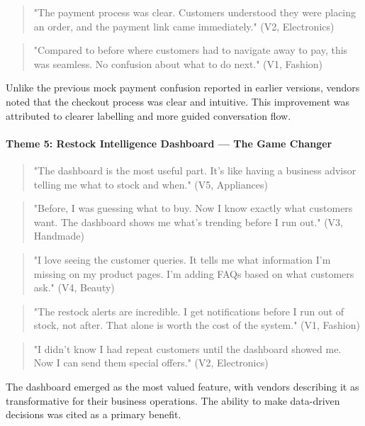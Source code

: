 \documentclass[12pt,a4paper]{article}
\begin{document}
\begin{quote}
"The payment process was clear. Customers understood they were placing an order, and the payment link came immediately." (V2, Electronics)
\end{quote}

\begin{quote}
"Compared to before where customers had to navigate away to pay, this was seamless. No confusion about what to do next." (V1, Fashion)
\end{quote}

Unlike the previous mock payment confusion reported in earlier versions, vendors noted that the checkout process was clear and intuitive. This improvement was attributed to clearer labelling and more guided conversation flow.

\paragraph{Theme 5: Restock Intelligence Dashboard --- The Game Changer}

\begin{quote}
"The dashboard is the most useful part. It's like having a business advisor telling me what to stock and when." (V5, Appliances)
\end{quote}

\begin{quote}
"Before, I was guessing what to buy. Now I know exactly what customers want. The dashboard shows me what's trending before I run out." (V3, Handmade)
\end{quote}

\begin{quote}
"I love seeing the customer queries. It tells me what information I'm missing on my product pages. I'm adding FAQs based on what customers ask." (V4, Beauty)
\end{quote}

\begin{quote}
"The restock alerts are incredible. I get notifications before I run out of stock, not after. That alone is worth the cost of the system." (V1, Fashion)
\end{quote}

\begin{quote}
"I didn't know I had repeat customers until the dashboard showed me. Now I can send them special offers." (V2, Electronics)
\end{quote}

The dashboard emerged as the most valued feature, with vendors describing it as transformative for their business operations. The ability to make data-driven decisions was cited as a primary benefit.
\end{document}
